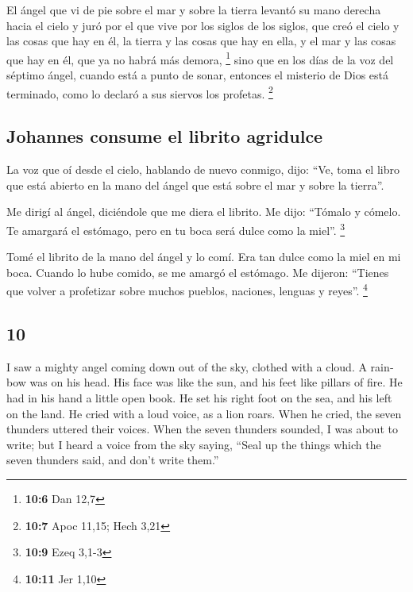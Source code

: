 \begin{paracol}{2}
 El ángel que vi de pie sobre el mar y sobre la tierra
levantó su mano derecha hacia el cielo  y juró por el que
vive por los siglos de los siglos, que creó el cielo y las cosas que hay
en él, la tierra y las cosas que hay en ella, y el mar y las cosas que
hay en él, que ya no habrá más demora, \footnote{\textbf{10:6} Dan 12,7}
 sino que en los días de la voz del séptimo ángel, cuando
está a punto de sonar, entonces el misterio de Dios está terminado, como
lo declaró a sus siervos los profetas. \footnote{\textbf{10:7} Apoc
  11,15; Hech 3,21}

\hypertarget{johannes-consume-el-librito-agridulce}{%
\subsection{Johannes consume el librito
agridulce}\label{johannes-consume-el-librito-agridulce}}

 La voz que oí desde el cielo, hablando de nuevo conmigo,
dijo: ``Ve, toma el libro que está abierto en la mano del ángel que está
sobre el mar y sobre la tierra''.

 Me dirigí al ángel, diciéndole que me diera el librito.
Me dijo: ``Tómalo y cómelo. Te amargará el estómago, pero en tu boca
será dulce como la miel''. \footnote{\textbf{10:9} Ezeq 3,1-3}

 Tomé el librito de la mano del ángel y lo comí. Era tan
dulce como la miel en mi boca. Cuando lo hube comido, se me amargó el
estómago.  Me dijeron: ``Tienes que volver a profetizar
sobre muchos pueblos, naciones, lenguas y reyes''. \footnote{\textbf{10:11}
  Jer 1,10}

\switchcolumn
\begin{otherlanguage}{english}

\hypertarget{section-19}{%
\section{10}\label{section-19}}

 I saw a mighty angel coming down out of the sky, clothed
with a cloud. A rainbow was on his head. His face was like the sun, and
his feet like pillars of fire.  He had in his hand a
little open book. He set his right foot on the sea, and his left on the
land.  He cried with a loud voice, as a lion roars. When
he cried, the seven thunders uttered their voices.  When
the seven thunders sounded, I was about to write; but I heard a voice
from the sky saying, ``Seal up the things which the seven thunders said,
and don't write them.''


\end{otherlanguage}
\end{paracol}

